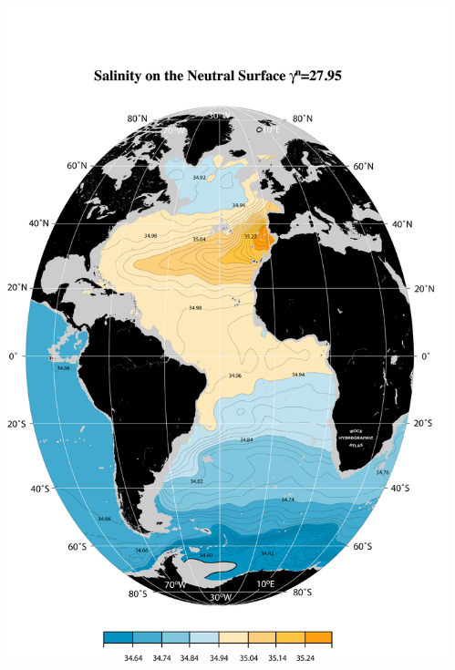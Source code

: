 \documentclass{beamer}
\begin{document}
\begin{frame}[plain,t]

    \begin{columns}
      \begin{column}{0.5\textwidth}
          \includegraphics[width=\textwidth]{salnty_isopyc_jpg/gam2795_sal.jpg}
       \end{column}
      \begin{column}{0.5\textwidth}

\end{column}
\end{columns}
\end{frame}
\end{document}
